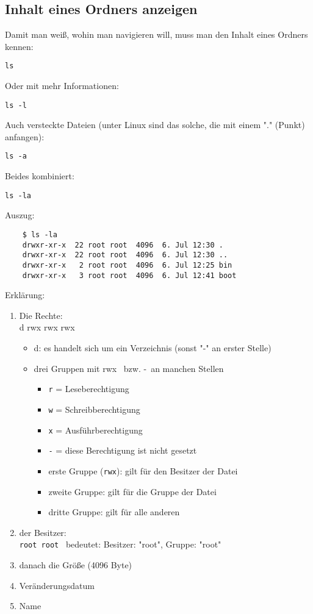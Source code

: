 \documentclass[a4paper,12pt]{article}
\begin{document}
\subsection{Inhalt eines Ordners anzeigen}
Damit man weiß, wohin man navigieren will, muss man den Inhalt eines 
Ordners kennen:  
\begin{lstlisting}
ls
\end{lstlisting} 
Oder mit mehr Informationen: 
\begin{lstlisting}
ls -l
\end{lstlisting} 
Auch versteckte Dateien (unter Linux sind das solche, die mit 
einem "." (Punkt) anfangen):
\begin{lstlisting}
ls -a
\end{lstlisting} 
Beides kombiniert:
\begin{lstlisting}
ls -la
\end{lstlisting} 
Auszug: 
\begin{verbatim}
	$ ls -la
	drwxr-xr-x  22 root root  4096  6. Jul 12:30 .
	drwxr-xr-x  22 root root  4096  6. Jul 12:30 ..
	drwxr-xr-x   2 root root  4096  6. Jul 12:25 bin
	drwxr-xr-x   3 root root  4096  6. Jul 12:41 boot
\end{verbatim}
Erklärung: 
\begin{enumerate}
\item Die Rechte: \\
d rwx rwx rwx
\begin{itemize}
\item d: es handelt sich um ein Verzeichnis (sonst "-" an erster Stelle)
\item drei Gruppen mit \glqq rwx\grqq~ bzw. \glqq -\grqq ~an manchen Stellen
\begin{itemize}
\item \texttt{r} = Leseberechtigung
\item \texttt{w} = Schreibberechtigung
\item \texttt{x} = Ausführberechtigung
\item \texttt{\glqq -\grqq} = diese Berechtigung ist nicht gesetzt
\item erste Gruppe (\glqq \texttt{rwx}\grqq ): gilt für den Besitzer der Datei
\item zweite Gruppe: gilt für die Gruppe der Datei
\item dritte Gruppe: gilt für alle anderen
\end{itemize}
\end{itemize}
\item der Besitzer: \\
\texttt{root root} ~bedeutet: Besitzer: "root", Gruppe: "root"
\item danach die Größe (4096 Byte)
\item Veränderungsdatum
\item Name
\end{enumerate}
\end{document}
